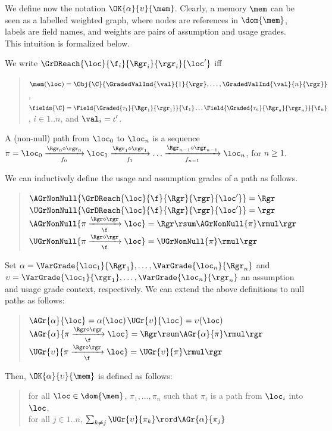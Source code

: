 

We define now the notation $\OK{\alpha}{\upsilon}{\mem}$. Clearly, a memory $\mem$ can be seen as a labelled weighted graph, where nodes are references in $\dom{\mem}$, labels are field names, and weights are pairs of assumption and usage grades. This intuition is formalized below.

We write $\GrDReach{\loc}{\f_i}{\Rgr_i}{\rgr_i}{\loc'}$ iff  
\begin{quote}
 $\mem(\loc)=\Obj{\C}{\GradedValInd{\val}{1}{\rgr},\ldots,\GradedValInd{\val}{n}{\rgr}}$, $\fields{\C}=\Field{\Graded{\tau_1}{\Rgr_1}{\rgr_1}}{\f_1} \ldots \Field{\Graded{\tau_n}{\Rgr_n}{\rgr_n}}{\f_n}$, $i\in 1..n$, and $\val_i=\iota'$. 
\end{quote}

A (non-null) path from $\loc_0$ to $\loc_n$ is a sequence $\pi=\loc_0\xrightarrow[f_0]{\Rgr_0\diamond\rgr_0}\loc_1\xrightarrow[f_1]{\Rgr_1\diamond\rgr_1}\ldots\xrightarrow[f_{n-1}]{\Rgr_{n-1}\diamond\rgr_{n-1}}\loc_n$, for $n\geq 1$.  

We can inductively define the usage and assumption grades of a path as follows.

\begin{quote}
$\AGrNonNull{\GrDReach{\loc}{\f}{\Rgr}{\rgr}{\loc'}}=\Rgr$\BigSpace$\UGrNonNull{\GrDReach{\loc}{\f}{\Rgr}{\rgr}{\loc'}}=\rgr$\\
$\AGrNonNull{\pi\xrightarrow[\f]{\Rgr\diamond\rgr}\loc}=\Rgr\rsum\AGrNonNull{\pi}\rmul\rgr$\BigSpace$\UGrNonNull{\pi\xrightarrow[\f]{\Rgr\diamond\rgr}\loc}=	\UGrNonNull{\pi}\rmul\rgr$
\end{quote}

Set $\alpha=\VarGrade{\loc_1}{\Rgr_1}, \ldots, \VarGrade{\loc_n}{\Rgr_n}$ and $\upsilon=\VarGrade{\loc_1}{\rgr_1}, \ldots, \VarGrade{\loc_n}{\rgr_n}$ an assumption and usage grade context, respectively.
We can extend the above definitions to null paths as follows:

\begin{quote}
$\AGr{\alpha}{\loc}=\alpha(\loc)$\BigSpace$\UGr{\upsilon}{\loc}=\upsilon(\loc)$\\
$\AGr{\alpha}{\pi\xrightarrow[\f]{\Rgr\diamond\rgr}\loc}=\Rgr\rsum\AGr{\alpha}{\pi}\rmul\rgr$\BigSpace$\UGr{\upsilon}{\pi\xrightarrow[\f]{\Rgr\diamond\rgr}\loc}=	\UGr{\upsilon}{\pi}\rmul\rgr$
\end{quote}

Then,  $\OK{\alpha}{\upsilon}{\mem}$ is defined as follows:
\begin{quote}
for all $\loc\in\dom{\mem}$, $\pi_1,\ldots,\pi_n$ such that $\pi_i$ is a path from $\loc_i$ into $\loc$,\\
for all $j\in 1..n$, $\sum_{k \neq j} \UGr{\upsilon}{\pi_k} \rord \AGr{\alpha}{\pi_j}$
\end{quote}

